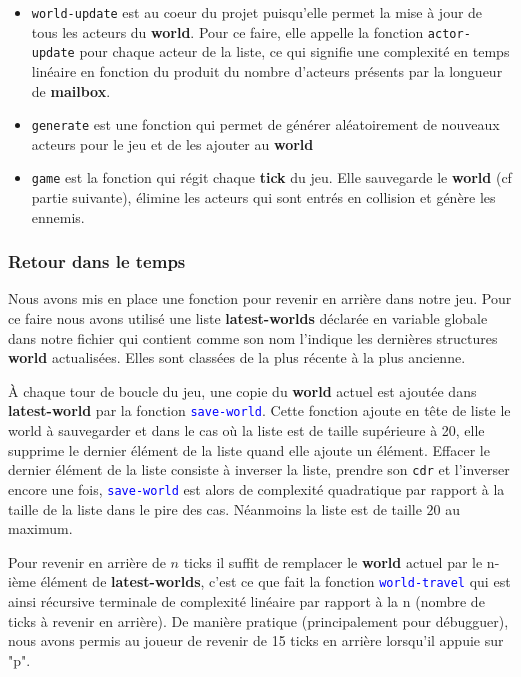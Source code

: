 \documentclass{article}
\begin{document}
\begin{itemize}
    \item \lstinline{world-update} est au coeur du projet puisqu'elle permet la mise à jour de tous les acteurs du \textbf{world}. Pour ce faire, elle appelle la fonction \lstinline{actor-update} pour chaque acteur de la liste, ce qui signifie une complexité en temps linéaire en fonction du produit du nombre d'acteurs présents par la longueur de \textbf{mailbox}.
    \item \lstinline{generate} est une fonction qui permet de générer aléatoirement de nouveaux acteurs pour le jeu et de les ajouter au \textbf{world}
    \item \lstinline{game} est la fonction qui régit chaque \textbf{tick} du jeu. Elle sauvegarde le \textbf{world} (cf partie suivante), élimine les acteurs qui sont entrés en collision et génère les ennemis.

\end{itemize}

\subsubsection{Retour dans le temps} 

Nous avons mis en place une fonction pour revenir en arrière dans notre jeu. Pour ce faire nous avons utilisé une liste \textbf{latest-worlds} déclarée en variable globale dans notre fichier qui contient comme son nom l'indique les dernières structures \textbf{world} actualisées. Elles sont classées de la plus récente à la plus ancienne. 

À chaque tour de boucle du jeu, une copie du \textbf{world} actuel est ajoutée dans \textbf{latest-world} par la fonction \textcolor{blue}{\lstinline{save-world}}. Cette fonction ajoute en tête de liste le world à sauvegarder et dans le cas où la liste est de taille supérieure à 20, elle supprime le dernier élément de la liste quand elle ajoute un élément. Effacer le dernier élément de la liste consiste à inverser la liste, prendre son \lstinline{cdr} et l'inverser encore une fois, \textcolor{blue}{\lstinline{save-world}} est alors de complexité quadratique par rapport à la taille de la liste dans le pire des cas. Néanmoins la liste est de taille $20$ au maximum.

Pour revenir en arrière de $n$ ticks il suffit de remplacer le \textbf{world} actuel par le n-ième élément de \textbf{latest-worlds}, c'est ce que fait la fonction \textcolor{blue}{\lstinline{world-travel}} qui est ainsi récursive terminale de complexité linéaire par rapport à la n (nombre de ticks à revenir en arrière). De manière pratique (principalement pour débugguer), nous avons permis au joueur de revenir de 15 ticks en arrière lorsqu'il appuie sur "p".
\end{document}
